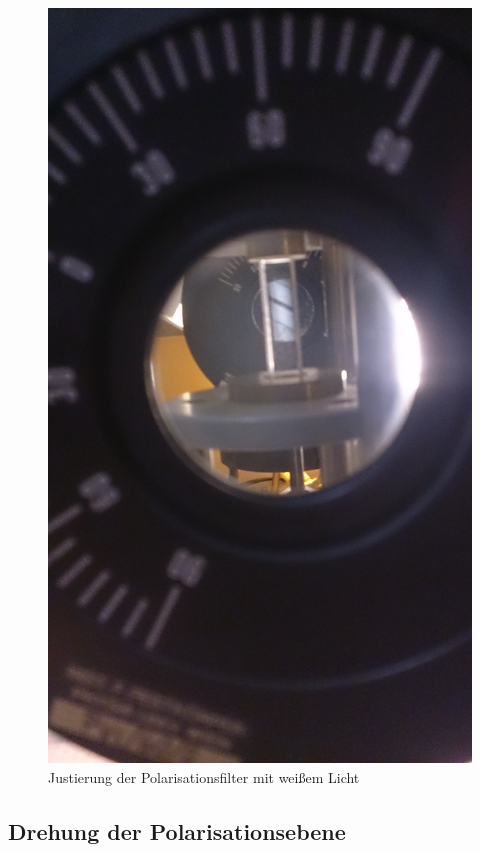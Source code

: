 \documentclass[12pt,a4paper]{article}
\begin{document}
\begin{multicols}{2}
\begin{figure}[H]
	\centering
	\includegraphics[scale=0.1,angle=-90]{./data/PS5_2_Filterjustierung.jpg}
	\caption{Justierung der Polarisationsfilter mit weißem Licht}
	\label{fig:spannung_justierung}
\end{figure}

\subsection{Drehung der Polarisationsebene}


\end{multicols}
\end{document}
